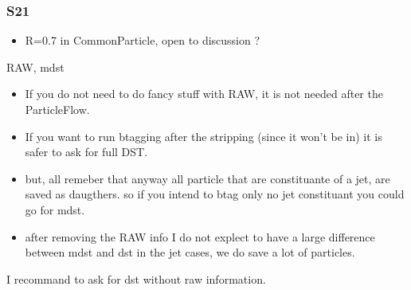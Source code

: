 \documentclass[compress,10pt]{beamer}
\begin{document}
\begin{frame}
    \frametitle{S21}  
    \begin{block}{}
        \begin{itemize}
            \item R=0.7 in CommonParticle, open to discussion ?
        \end{itemize}
    \end{block}

    \begin{block}{RAW, mdst}
        \begin{itemize}
            \item If you do not need to do fancy stuff with RAW, it is not needed after the ParticleFlow.
            \item If you want to run btagging after the stripping (since it won't be in) it is safer to ask for full DST.
            \item but, all remeber that anyway all particle that are constituante of a jet, are saved as daugthers. so if you intend to btag only no jet constituant you could go for mdst.
            \item after removing the RAW info I do not explect to have a large difference between mdst and dst in the jet cases, we do save a lot of particles.
        \end{itemize}
    \end{block}
    \begin{block}{}
I recommand to ask for dst without raw information.
\end{block}
\end{frame}
\end{document}
